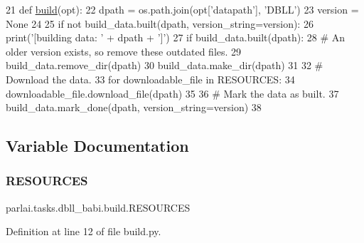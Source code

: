 \begin{DoxyCode}
21 \textcolor{keyword}{def }\hyperlink{namespacedialog__babi__feedback_1_1build_a7a9d289f7493a5ded13c4b7f071b6184}{build}(opt):
22     dpath = os.path.join(opt[\textcolor{stringliteral}{'datapath'}], \textcolor{stringliteral}{'DBLL'})
23     version = \textcolor{keywordtype}{None}
24 
25     \textcolor{keywordflow}{if} \textcolor{keywordflow}{not} build\_data.built(dpath, version\_string=version):
26         print(\textcolor{stringliteral}{'[building data: '} + dpath + \textcolor{stringliteral}{']'})
27         \textcolor{keywordflow}{if} build\_data.built(dpath):
28             \textcolor{comment}{# An older version exists, so remove these outdated files.}
29             build\_data.remove\_dir(dpath)
30         build\_data.make\_dir(dpath)
31 
32         \textcolor{comment}{# Download the data.}
33         \textcolor{keywordflow}{for} downloadable\_file \textcolor{keywordflow}{in} RESOURCES:
34             downloadable\_file.download\_file(dpath)
35 
36         \textcolor{comment}{# Mark the data as built.}
37         build\_data.mark\_done(dpath, version\_string=version)
38 \end{DoxyCode}


\subsection{Variable Documentation}
\mbox{\label{namespaceparlai_1_1tasks_1_1dbll__babi_1_1build_a005b71281b53af40ed3ff6336d4d05b0}} 
\subsubsection{\texorpdfstring{R\+E\+S\+O\+U\+R\+C\+ES}{RESOURCES}}
{\footnotesize\ttfamily parlai.\+tasks.\+dbll\+\_\+babi.\+build.\+R\+E\+S\+O\+U\+R\+C\+ES}



Definition at line 12 of file build.\+py.

